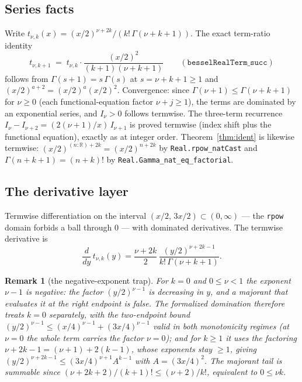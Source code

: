 \documentclass[11pt]{article}
\newtheorem{remark}[theorem]{Remark}
\newcommand{\lean}[1]{\texttt{#1}}
\begin{document}
\subsection{Series facts}\label{sec:series}

Write $t_{\nu,k}(x) = (x/2)^{\nu+2k}/(k!\,\Gamma(\nu+k+1))$.  The
exact term-ratio identity
\[
t_{\nu,k+1} \;=\; t_{\nu,k}\cdot
\frac{(x/2)^2}{(k+1)(\nu+k+1)}
\qquad (\lean{besselRealTerm\_succ})
\]
follows from $\Gamma(s+1) = s\,\Gamma(s)$ at $s = \nu+k+1 \ge 1$ and
$(x/2)^{a+2} = (x/2)^a(x/2)^2$.  Convergence: since
$\Gamma(\nu+1) \le \Gamma(\nu+k+1)$ for $\nu \ge 0$ (each
functional-equation factor $\nu+j \ge 1$), the terms are dominated
by an exponential series, and $I_\nu > 0$ follows termwise.  The
three-term recurrence
$I_\nu - I_{\nu+2} = (2(\nu+1)/x)\,I_{\nu+1}$ is proved termwise
(index shift plus the functional equation), exactly as at integer
order.  Theorem~\ref{thm:ident} is likewise termwise:
$(x/2)^{(n:\mathbb{R})+2k} = (x/2)^{n+2k}$ by
\lean{Real.rpow\_natCast} and
$\Gamma(n+k+1) = (n+k)!$ by \lean{Real.Gamma\_nat\_eq\_factorial}.

\subsection{The derivative layer}\label{sec:deriv}

Termwise differentiation on the interval
$(x/2,\,3x/2) \subset (0,\infty)$ --- the \lean{rpow} domain forbids
a ball through $0$ --- with dominated derivatives.  The termwise
derivative is
\[
\frac{d}{dy}\, t_{\nu,k}(y)
= \frac{\nu+2k}{2}\,
\frac{(y/2)^{\nu+2k-1}}{k!\,\Gamma(\nu+k+1)} .
\]

\begin{remark}[the negative-exponent trap]\label{rem:negexp}
For $k = 0$ and $0 \le \nu < 1$ the exponent $\nu-1$ is negative:
the factor $(y/2)^{\nu-1}$ is \emph{decreasing} in $y$, and a
majorant that evaluates it at the right endpoint is false.  The
formalized domination therefore treats $k=0$ separately, with the
two-endpoint bound
$(y/2)^{\nu-1} \le (x/4)^{\nu-1} + (3x/4)^{\nu-1}$ valid in both
monotonicity regimes (at $\nu = 0$ the whole term carries the factor
$\nu = 0$); and for $k \ge 1$ it uses the factoring
$\nu+2k-1 = (\nu+1) + 2(k-1)$, whose exponents stay $\ge 1$, giving
$(y/2)^{\nu+2k-1} \le (3x/4)^{\nu+1} A^{k-1}$ with $A = (3x/4)^2$.
The majorant tail is summable since
$(\nu+2k+2)/(k+1)! \le (\nu+2)/k!$, equivalent to $0 \le \nu k$.
\end{remark}
\end{document}
